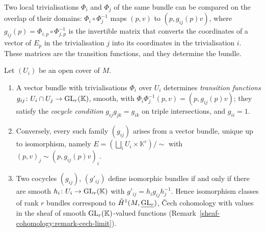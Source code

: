 Two local trivialisations $\Phi_i$ and $\Phi_j$ of the same bundle can be compared on the overlap of their domains: $\Phi_i \circ \Phi_j^{-1}$ maps $(p, v)$ to
$(p, g_{ij}(p)v)$, where $g_{ij}(p) = \Phi_{i,p} \circ \Phi_{j,p}^{-1}$ is the invertible matrix that converts the coordinates of a vector of $E_p$ in the trivialisation $j$ into
its coordinates in the trivialisation $i$. These matrices are the transition functions, and they determine the bundle.

\begin{proposition}\label{vector-bundles:proposition-cocycles}
Let $(U_i)$ be an open cover of $M$.
\begin{enumerate}
\item A vector bundle with trivialisations $\Phi_i$ over $U_i$ determines \emph{transition functions} $g_{ij} \colon U_i \cap U_j \to \mathrm{GL}_r(\mathbb{K})$, smooth, with
$\Phi_i\Phi_j^{-1}(p, v) = (p, g_{ij}(p)v)$; they satisfy the \emph{cocycle condition} $g_{ij}g_{jk} = g_{ik}$ on triple intersections, and $g_{ii} = 1$.
\item Conversely, every such family $(g_{ij})$ arises from a vector bundle, unique up to isomorphism, namely $E = (\bigsqcup_i U_i \times \mathbb{K}^r)/\sim$ with $(p, v)_j \sim (p, g_{ij}(p)v)_i$.
\item Two cocycles $(g_{ij})$, $(g'_{ij})$ define isomorphic bundles if and only if there are smooth $h_i \colon U_i \to \mathrm{GL}_r(\mathbb{K})$ with $g'_{ij} = h_ig_{ij}h_j^{-1}$. Hence isomorphism classes of rank
$r$ bundles correspond to $\check{H}^1(M, \underline{\mathrm{GL}_r})$, \v{C}ech cohomology with values in the sheaf of smooth $\mathrm{GL}_r(\mathbb{K})$-valued functions
(Remark~\ref{sheaf-cohomology:remark-cech-limit}).
\end{enumerate}
\end{proposition}

